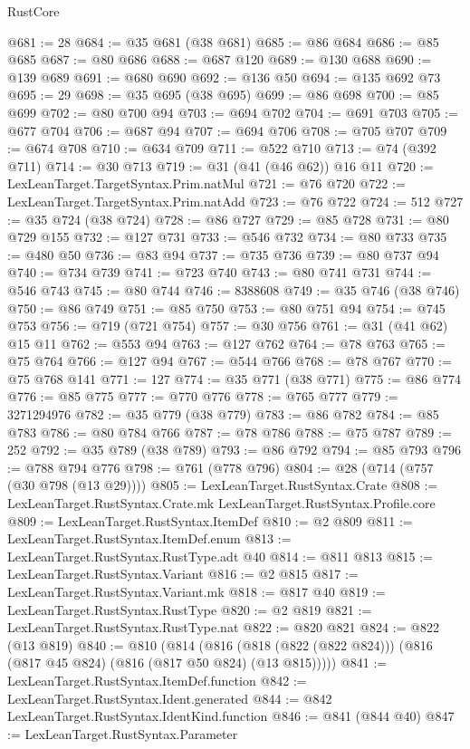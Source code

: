 \begin{lexlean}{RustCore}
\begin{coremodule}
@681 := 28
@684 := @35 @681 (@38 @681)
@685 := @86 @684
@686 := @85 @685
@687 := @80 @686
@688 := @687 @120
@689 := @130 @688
@690 := @139 @689
@691 := @680 @690
@692 := @136 @50
@694 := @135 @692 @73
@695 := 29
@698 := @35 @695 (@38 @695)
@699 := @86 @698
@700 := @85 @699
@702 := @80 @700 @94
@703 := @694 @702
@704 := @691 @703
@705 := @677 @704
@706 := @687 @94
@707 := @694 @706
@708 := @705 @707
@709 := @674 @708
@710 := @634 @709
@711 := @522 @710
@713 := @74 (@392 @711)
@714 := @30 @713
@719 := @31 (@41 (@46 @62)) @16 @11
@720 := LexLeanTarget.TargetSyntax.Prim.natMul
@721 := @76 @720
@722 := LexLeanTarget.TargetSyntax.Prim.natAdd
@723 := @76 @722
@724 := 512
@727 := @35 @724 (@38 @724)
@728 := @86 @727
@729 := @85 @728
@731 := @80 @729 @155
@732 := @127 @731
@733 := @546 @732
@734 := @80 @733
@735 := @480 @50
@736 := @83 @94
@737 := @735 @736
@739 := @80 @737 @94
@740 := @734 @739
@741 := @723 @740
@743 := @80 @741 @731
@744 := @546 @743
@745 := @80 @744
@746 := 8388608
@749 := @35 @746 (@38 @746)
@750 := @86 @749
@751 := @85 @750
@753 := @80 @751 @94
@754 := @745 @753
@756 := @719 (@721 @754)
@757 := @30 @756
@761 := @31 (@41 @62) @15 @11
@762 := @553 @94
@763 := @127 @762
@764 := @78 @763
@765 := @75 @764
@766 := @127 @94
@767 := @544 @766
@768 := @78 @767
@770 := @75 @768 @141
@771 := 127
@774 := @35 @771 (@38 @771)
@775 := @86 @774
@776 := @85 @775
@777 := @770 @776
@778 := @765 @777
@779 := 3271294976
@782 := @35 @779 (@38 @779)
@783 := @86 @782
@784 := @85 @783
@786 := @80 @784 @766
@787 := @78 @786
@788 := @75 @787
@789 := 252
@792 := @35 @789 (@38 @789)
@793 := @86 @792
@794 := @85 @793
@796 := @788 @794 @776
@798 := @761 (@778 @796)
@804 := @28 (@714 (@757 (@30 @798 (@13 @29))))
@805 := LexLeanTarget.RustSyntax.Crate
@808 := LexLeanTarget.RustSyntax.Crate.mk LexLeanTarget.RustSyntax.Profile.core
@809 := LexLeanTarget.RustSyntax.ItemDef
@810 := @2 @809
@811 := LexLeanTarget.RustSyntax.ItemDef.enum
@813 := LexLeanTarget.RustSyntax.RustType.adt @40
@814 := @811 @813
@815 := LexLeanTarget.RustSyntax.Variant
@816 := @2 @815
@817 := LexLeanTarget.RustSyntax.Variant.mk
@818 := @817 @40
@819 := LexLeanTarget.RustSyntax.RustType
@820 := @2 @819
@821 := LexLeanTarget.RustSyntax.RustType.nat
@822 := @820 @821
@824 := @822 (@13 @819)
@840 := @810
    (@814 (@816 (@818 (@822 (@822 @824))) (@816 (@817 @45 @824) (@816 (@817 @50 @824) (@13 @815)))))
@841 := LexLeanTarget.RustSyntax.ItemDef.function
@842 := LexLeanTarget.RustSyntax.Ident.generated
@844 := @842 LexLeanTarget.RustSyntax.IdentKind.function
@846 := @841 (@844 @40)
@847 := LexLeanTarget.RustSyntax.Parameter

\end{coremodule}
\end{lexlean}
